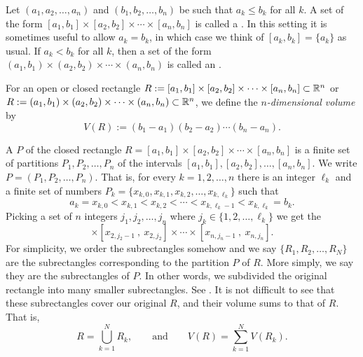 \begin{defn}
Let $(a_1,a_2,\ldots,a_n)$ and
$(b_1,b_2,\ldots,b_n)$ be such that $a_k \leq b_k$ for all $k$.
A set of the form
$[a_1,b_1] \times
[a_2,b_2] \times \cdots \times
[a_n,b_n]$ is called a \emph{}.
In this setting it is sometimes useful to allow $a_k = b_k$, in which case we 
think of $[a_k,b_k] = \{ a_k \}$ as usual.
If $a_k < b_k$ for all $k$, then a set of the form
$(a_1,b_1) \times
(a_2,b_2) \times \cdots \times
(a_n,b_n)$ is called an \emph{}.

For an open or closed rectangle
$R := [a_1,b_1] \times
[a_2,b_2] \times \cdots \times
[a_n,b_n] \subset {\mathbb{R}}^n$
or
$R := (a_1,b_1) \times
(a_2,b_2) \times \cdots \times
(a_n,b_n) \subset {\mathbb{R}}^n$,
we define the
\emph{$n$-dimensional volume}%
%
 by
\begin{equation*}
V(R) :=
(b_1-a_1)
(b_2-a_2)
\cdots
(b_n-a_n) .
\end{equation*}

A \emph{} $P$ of the closed rectangle
$R = [a_1,b_1] \times
[a_2,b_2] \times \cdots \times
[a_n,b_n]$
is
a finite set of 
partitions $P_1,P_2,\ldots,P_n$ of the intervals
$[a_1,b_1], [a_2,b_2],\ldots, [a_n,b_n]$.
We write $P=(P_1,P_2,\ldots,P_n)$.
That is, for every $k=1,2,\ldots,n$ there is an integer $\ell_k$ and
a finite set of numbers
$P_k = \{ x_{k,0},x_{k,1},x_{k,2},\ldots,x_{k,\ell_k} \}$ such that
\begin{equation*}
a_k = x_{k,0} < x_{k,1} < x_{k,2} < \cdots < x_{k,{\ell_k}-1} < x_{k,\ell_k} = b_k .
\end{equation*}
Picking a set of $n$ integers $j_1,j_2,\ldots,j_n$ where
$j_k \in \{ 1,2,\ldots,\ell_k \}$ we get
the
\emph{}
\begin{equation*}
[x_{1,j_1-1}~,~ x_{1,j_1}]
\times
[x_{2,j_2-1}~,~ x_{2,j_2}]
\times
\cdots
\times
[x_{n,j_n-1}~,~ x_{n,j_n}] .
\end{equation*}
For simplicity, we order the subrectangles somehow and
we say $\{R_1,R_2,\ldots,R_N\}$ are the subrectangles corresponding
to the partition $P$ of $R$.  More simply, we say they are the subrectangles of
$P$.
In other words, we subdivided the original rectangle into many smaller
subrectangles.  See .  It is not difficult to see that
these subrectangles cover our original $R$, and their
volume sums to that of $R$.  That is,
\begin{equation*}
R= \bigcup_{k=1}^N R_k , \qquad \text{and} \qquad
V(R) = \sum_{k=1}^N V(R_k).
\end{equation*}


\end{defn}
